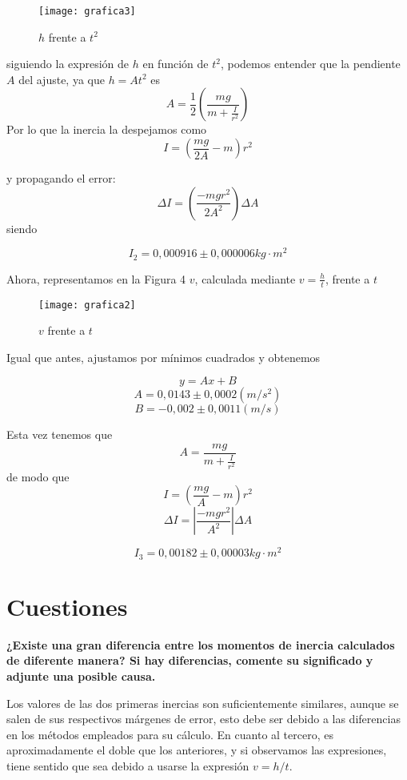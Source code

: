 \documentclass[a4paper,12pt,spanish]{article}
\begin{document}
\begin{figure}[H]
	\centering
	\texttt{[image: grafica3]}
	\caption{$h$ frente a $t^2$}
	\label{fig:grafica1}
\end{figure}

siguiendo la expresión de $h$ en función de $t^2$, podemos entender que la pendiente $A$ del ajuste, ya que $h = At^2$ es 
\[A = \frac{1}{2}\left(\frac{mg}{m+\frac{I}{r^2}}\right)\]
Por lo que la inercia la despejamos como
\[ I = \left( \frac{ m g}{2A}- m \right)r^2 \]

y propagando el error:
\[\Delta I =  \left( \frac{- m g r^2}{2A^2} \right) \Delta A \]
siendo 



\[\boxed{ I_2 = 0,000916 \pm 0,000006 \si{kg \cdot m^2}} \]

Ahora, representamos en la Figura 4 $v$, calculada mediante $v= \frac{h}{t}$, frente a $t$

\begin{figure}[H]
	\centering
	\texttt{[image: grafica2]}
	\caption{$v$ frente a $t$}
	\label{fig:grafica2}
\end{figure}

Igual que antes, ajustamos por mínimos cuadrados y obtenemos 

\[ y = Ax+B\]
\[A = 0,0143  \pm  0,0002 (\si{m/s^2}) \]
\[B = -0,002 \pm  0,0011  (\si{m/s}) \]

Esta vez tenemos que 
\[A = \frac{mg}{m+\frac{I}{r^2}} \]
de modo que 
\[I = \left(\frac{mg}{A}- m\right) r^2\]
\[\Delta I = \left|\frac{ - mg r^2}{A^2} \right| \Delta A \]

\[ \boxed{I_3 = 0,00182 \pm 0,00003  \si{kg \cdot m^2}  }\]



	\section{Cuestiones}
	
	\textbf{¿Existe una gran diferencia entre los momentos de inercia calculados de diferente manera? Si hay diferencias, comente su significado y
		adjunte una posible causa.}
	
	Los valores de las dos primeras inercias son suficientemente similares, aunque se salen de sus respectivos márgenes de error, esto debe ser debido a las diferencias en los métodos empleados para su cálculo.
	En cuanto al tercero, es aproximadamente el doble que los anteriores, y si observamos las expresiones, tiene sentido que sea debido a usarse la expresión $v= h/t$.
	
\end{document}
